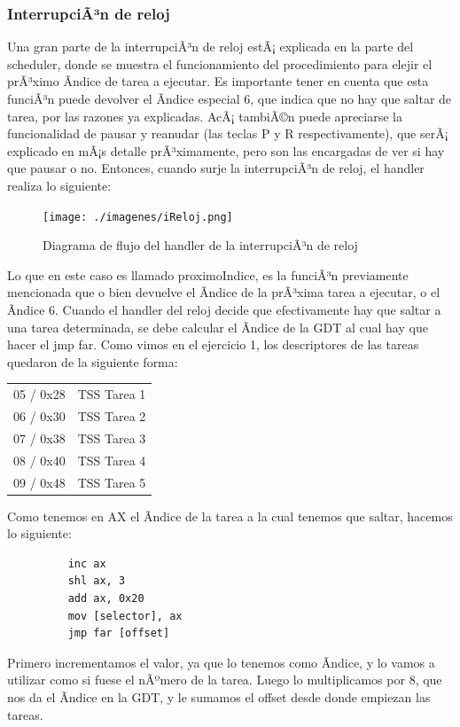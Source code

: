\documentclass[10pt, a4paper]{article}
\begin{document}
\subsubsection*{InterrupciÃ³n de reloj}
Una gran parte de la interrupciÃ³n de reloj estÃ¡ explicada en la parte del scheduler, donde se muestra el funcionamiento del procedimiento para elejir el prÃ³ximo Ã­ndice de tarea a ejecutar. Es importante tener en cuenta que esta funciÃ³n puede devolver el Ã­ndice especial 6, que indica que no hay que saltar de tarea, por las razones ya explicadas.
AcÃ¡ tambiÃ©n puede apreciarse la funcionalidad de pausar y reanudar (las teclas P y R respectivamente), que serÃ¡ explicado en mÃ¡s detalle prÃ³ximamente, pero son las encargadas de ver si hay que pausar o no.
Entonces, cuando surje la interrupciÃ³n de reloj, el handler realiza lo siguiente:

	\begin{figure}[H]
  		\centering
		\texttt{[image: ./imagenes/iReloj.png]}
		\caption{Diagrama de flujo del handler de la interrupciÃ³n de reloj}
		\label{fig:iReloj}
	\end{figure}
Lo que en este caso es llamado proximoIndice, es la funciÃ³n previamente mencionada que o bien devuelve el Ã­ndice de la prÃ³xima tarea a ejecutar, o el Ã­ndice 6.
Cuando el handler del reloj decide que efectivamente hay que saltar a una tarea determinada, se debe calcular el Ã­ndice de la GDT al cual hay que hacer el jmp far.
Como vimos en el ejercicio 1, los descriptores de las tareas quedaron de la siguiente forma:
\begin{table}[H]
\centering
    \begin{tabular}{|c|l|}
        \hline
        05 / 0x28 & TSS Tarea 1 \\ 
        06 / 0x30 & TSS Tarea 2 \\ 
        07 / 0x38 & TSS Tarea 3  \\ 
        08 / 0x40 & TSS Tarea 4 \\ 
        09 / 0x48 & TSS Tarea 5 \\ 
        \hline
    \end{tabular}
\end{table}
Como tenemos en AX el Ã­ndice de la tarea a la cual tenemos que saltar, hacemos lo siguiente:
\begin{figure}[!h]
\begin{center}
\begin{verbatim}
	inc ax 
	shl ax, 3
	add ax, 0x20
	mov [selector], ax
	jmp far [offset]
\end{verbatim}
\end{center}
\end{figure}
Primero incrementamos el valor, ya que lo tenemos como Ã­ndice, y lo vamos a utilizar como si fuese el nÃºmero de la tarea. Luego lo multiplicamos por 8, que nos da el Ã­ndice en la GDT, y le sumamos el offset desde donde empiezan las tareas.
\end{document}
